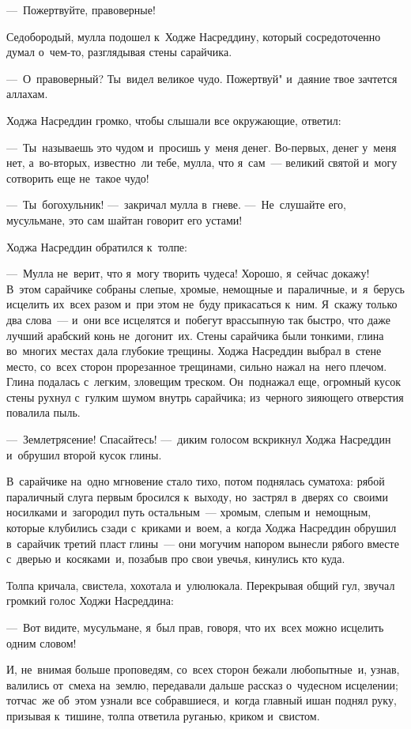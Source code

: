 \documentclass[12pt,a4paper]{book}
\begin{document}
—~Пожертвуйте, правоверные!

Седобородый, мулла подошел к~Ходже Насреддину, который сосредоточенно думал о~чем-то, разглядывая стены сарайчика.

—~О~правоверный? Ты~видел великое чудо. Пожертвуй" и~даяние твое зачтется аллахам.

Ходжа Насреддин громко, чтобы слышали все окружающие, ответил:

—~Ты~называешь это чудом и~просишь у~меня денег. Во-первых, денег у~меня нет, а~во-вторых, известно~ли тебе, мулла, что я~сам~— великий святой и~могу сотворить еще не~такое чудо!

—~Ты~богохульник! —~закричал мулла в~гневе. —~Не~слушайте его, мусульмане, это сам шайтан говорит его устами!

Ходжа Насреддин обратился к~толпе:

—~Мулла не~верит, что я~могу творить чудеса! Хорошо, я~сейчас докажу! В~этом сарайчике собраны слепые, хромые, немощные и~параличные, и~я~берусь исцелить их~всех разом и~при этом не~буду прикасаться к~ним. Я~скажу только два слова~— и~они все исцелятся и~побегут врассыпную так быстро, что даже лучший арабский конь не~догонит~их. Стены сарайчика были тонкими, глина во~многих местах дала глубокие трещины. Ходжа Насреддин выбрал в~стене место, со~всех сторон прорезанное трещинами, сильно нажал на~него плечом. Глина подалась с~легким, зловещим треском. Он~поднажал еще, огромный кусок стены рухнул с~гулким шумом внутрь сарайчика; из~черного зияющего отверстия повалила пыль.

—~Землетрясение! Спасайтесь! —~диким голосом вскрикнул Ходжа Насреддин и~обрушил второй кусок глины.

В~сарайчике на~одно мгновение стало тихо, потом поднялась суматоха: рябой параличный слуга первым бросился к~выходу, но~застрял в~дверях со~своими носилками и~загородил путь остальным~— хромым, слепым и~немощным, которые клубились сзади с~криками и~воем, а~когда Ходжа Насреддин обрушил в~сарайчик третий пласт глины~— они могучим напором вынесли рябого вместе с~дверью и~косяками~и, позабыв про свои увечья, кинулись кто куда.

Толпа кричала, свистела, хохотала и~улюлюкала. Перекрывая общий гул, звучал громкий голос Ходжи Насреддина:

—~Вот видите, мусульмане, я~был прав, говоря, что их~всех можно исцелить одним словом!

И, не~внимая больше проповедям, со~всех сторон бежали любопытные~и, узнав, валились от~смеха на~землю, передавали дальше рассказ о~чудесном исцелении; тотчас~же об~этом узнали все собравшиеся, и~когда главный ишан поднял руку, призывая к~тишине, толпа ответила руганью, криком и~свистом.
\end{document}
